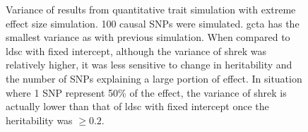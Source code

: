 \begin{figure}
{				
				\label{fig:ldscInQtEx100cVar}
			}
			\caption[Variance of Extreme Effect Size Simulation Result (100 Causal)]
			{Variance of results from quantitative trait simulation with extreme effect size simulation.
				100 causal \glspl{SNP} were simulated.
				\gls{gcta} has the smallest variance as with previous simulation.
				When compared to \gls{ldsc} with fixed intercept, although the variance of \gls{shrek} was relatively higher, it was less sensitive to change in heritability and the number of \glspl{SNP} explaining a large portion of effect.
				In situation where 1 \gls{SNP} represent 50\% of the effect, the variance of \gls{shrek} is actually lower than that of \gls{ldsc} with fixed intercept once the heritability was $\ge0.2$.
			} 
			\label{fig:QtEx100cVar}
		\end{figure}
		
